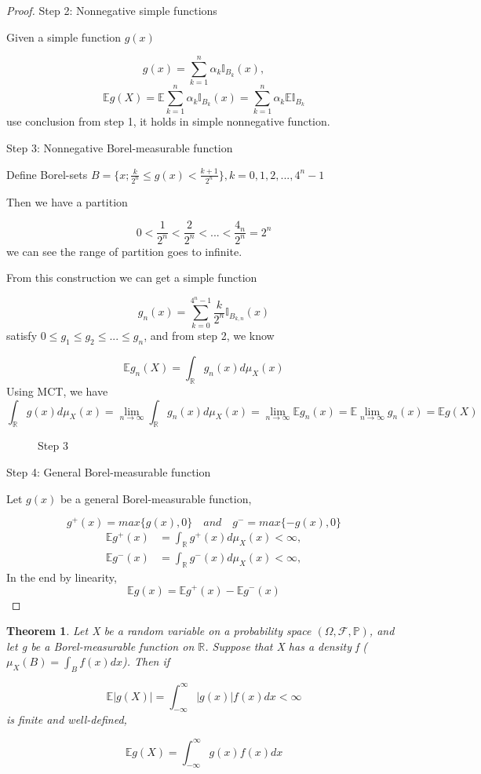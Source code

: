 \documentclass[a4]{article}
\newtheorem{theorem}{Theorem}
\begin{document}
\begin{proof}
\noindent Step 2: Nonnegative simple functions\par 
\bigbreak 
Given a simple function $g(x)$\par 
$$
g(x) = \sum^{n}_{k = 1}\alpha_{k}\mathbb{I}_{B_{k}}(x),
$$
$$
\mathbb{E}g(X) = \mathbb{E}\sum_{k = 1}^{n}\alpha_{k}\mathbb{I}_{B_{k}}(x) = \sum_{k = 1}^{n}\alpha_{k}\mathbb{E}\mathbb{I}_{B_{k}}
$$
use conclusion from step 1, it holds in simple nonnegative function.\par
\noindent Step 3: Nonnegative Borel-measurable function\par
\bigbreak 
Define Borel-sets $B = \{x; \frac{k}{2^{n}}\leq g(x)<\frac{k+1}{2^{n}}\}, k = 0, 1,2,...,4^{n} - 1$\par Then we have a partition \par 
$$
0<\frac{1}{2^{n}}<\frac{2}{2^{n}}<...<\frac{4_{n}}{2^{n}} = 2^{n}
$$
we can see the range of partition goes to infinite.\par 
From this construction we can get a simple function \par 
$$
g_{n}(x) = \sum^{4^{n} - 1}_{k = 0}\frac{k}{2^{n}}\mathbb{I}_{B_{k,n}}(x)
$$
satisfy $0\leq g_{1}\leq g_{2}\leq ...\leq g_{n}$, and from step 2, we know \par 
$$
\mathbb{E}g_{n}(X) = \int_{\mathbb{R}}g_{n}(x)d\mu_{X}(x)
$$
Using MCT, we have $$
\int_{\mathbb{R}}g(x)d\mu_{X}(x) = \lim_{n\rightarrow\infty}\int_{\mathbb{R}}g_{n}(x)d\mu_{X}(x) = \lim_{n\rightarrow\infty} \mathbb{E}g_{n}(x) = \mathbb{E}\lim_{n\rightarrow\infty} g_{n}(x) = \mathbb{E}g(X)
$$
\begin{figure}
	\centering
	\caption{Step 3}
	\label{fig:scan20201002}
\end{figure}
\par \bigbreak 
\noindent Step 4: General Borel-measurable function\par 
\bigbreak
Let $g(x)$ be a general Borel-measurable function,\par 
$$
g^{+}(x) = max\{g(x),0\}\quad and \quad g^{-} = max\{-g(x),0\}
$$
$$
\begin{aligned}
\mathbb{E}g^{+}(x) &= \int_{\mathbb{R}}g^{+}(x)d\mu_{X}(x)<\infty,\\
\mathbb{E}g^{-}(x) &= \int_{\mathbb{R}}g^{-}(x)d\mu_{X}(x)<\infty,
\end{aligned}
$$
In the end by linearity,
$$
\mathbb{E}g(x)  = \mathbb{E}g^{+}(x)  - \mathbb{E}g^{-}(x) 
$$
\end{proof}
\begin{theorem}
	Let X be a random variable on a probability space $(\Omega, \mathcal{F}, \mathbb{P})$, and let g be a Borel-measurable function on $\mathbb
	R$. Suppose that X has a density f ($\mu_{X}(B) = \int_{B}f(x)dx$). Then if \par 
	$$
	\mathbb{E}|g(X)| = \int^{\infty}_{-\infty}|g(x)|f(x)dx<\infty
	$$
	is finite and well-defined,\par 
		$$
	\mathbb{E}g(X) = \int^{\infty}_{-\infty}g(x)f(x)dx
	$$
\end{theorem}
\end{document}
